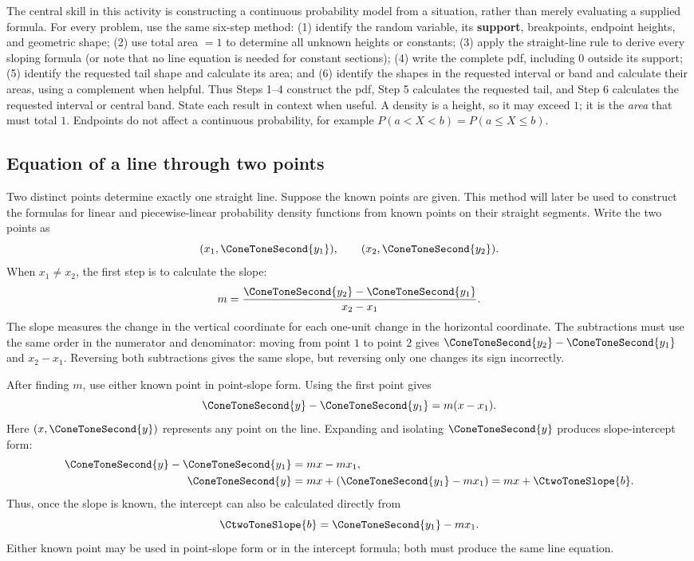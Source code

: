 The central skill in this activity is constructing a continuous probability
model from a situation, rather than merely evaluating a supplied formula.  For
every problem, use the same six-step method: (1) identify the random variable,
its \textbf{support}, breakpoints, endpoint heights, and geometric shape;
(2) use total area $=1$ to determine all unknown heights or constants;
(3) apply the straight-line rule to derive every sloping formula (or note that
no line equation is needed for constant sections); (4) write the complete pdf,
including $0$ outside its support; (5) identify the requested tail shape and
calculate its area; and (6) identify the shapes in the requested interval or
band and calculate their areas, using a complement when helpful.  Thus Steps
1--4 construct the pdf, Step 5 calculates the requested tail, and Step 6
calculates the requested interval or central band.  State each result in
context when useful.  A density is a height, so it may exceed
$1$; it is the \emph{area} that must total $1$.  Endpoints do not affect a
continuous probability, for example $P(a<X<b)=P(a\le X\le b)$.

\subsection{Equation of a line through two points}\label{sec:c2-intro-line-equation}
Two distinct points determine exactly one straight line.  Suppose the known
points are given.  This method will later be used to construct the formulas for
linear and piecewise-linear probability density functions from known points on
their straight segments.  Write the two points as
\[
 (x_1,\ConeToneSecond{y_1}),\qquad (x_2,\ConeToneSecond{y_2}).
\]
When $x_1\ne x_2$, the first step is to calculate the slope:
\[
 m=\frac{\ConeToneSecond{y_2}-\ConeToneSecond{y_1}}{x_2-x_1}.
\]
The slope measures the change in the vertical coordinate for each one-unit
change in the horizontal coordinate.  The subtractions must use the same order
in the numerator and denominator: moving from point $1$ to point $2$ gives
$\ConeToneSecond{y_2}-\ConeToneSecond{y_1}$ and $x_2-x_1$.  Reversing both subtractions gives the same slope,
but reversing only one changes its sign incorrectly.

After finding $m$, use either known point in point-slope form.  Using the first
point gives
\[
 \ConeToneSecond{y}-\ConeToneSecond{y_1}=m(x-x_1).
\]
Here $(x,\ConeToneSecond{y})$ represents any point on the line.  Expanding and isolating $\ConeToneSecond{y}$
produces slope-intercept form:
\[
 \begin{aligned}
 \ConeToneSecond{y}-\ConeToneSecond{y_1}&=mx-mx_1,\\
 \ConeToneSecond{y}&=mx+(\ConeToneSecond{y_1}-mx_1)=mx+\CtwoToneSlope{b}.
 \end{aligned}
\]
Thus, once the slope is known, the intercept can also be calculated directly
from
\[
 \CtwoToneSlope{b}=\ConeToneSecond{y_1}-mx_1.
\]
Either known point may be used in point-slope form or in the intercept formula;
both must produce the same line equation.

